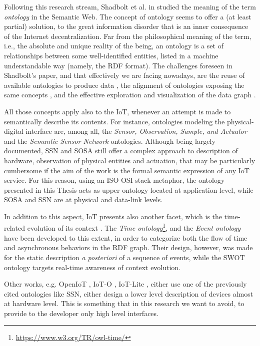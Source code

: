 Following this research stream, Shadbolt et al. in \cite{shadbolt2006semantic} studied the meaning of the term \textit{ontology} in the Semantic Web. The concept of ontology seems to offer a (at least partial) solution, to the great information disorder that is an inner consequence of the Internet decentralization. Far from the philosophical meaning of the term, i.e., the absolute and unique reality of the being, an ontology is a set of relationships between some well-identified entities, listed in a machine understandable way (namely, the RDF format). The challenges foreseen in Shadbolt's paper, and that effectively we are facing nowadays, are the reuse of available ontologies to produce data \cite{uschold1998ontology, bontas2005case, pan2006semantic}, the alignment of ontologies exposing the same concepts \cite{karim2007providing}, and the effective exploration and visualization of the data graph \cite{antoniazzi2018rdf, bikakis2016exploration}.

All those concepts apply also to the IoT, whenever an attempt is made to semantically describe its contents. For instance, ontologies modeling the physical-digital interface are, among all, the \textit{Sensor, Observation, Sample, and Actuator} and the \textit{Semantic Sensor Network}  ontologies. Although being largely documented, SSN and SOSA still offer a complex approach to description of hardware, observation of physical entities and actuation, that may be particularly cumbersome if the aim of the work is the formal semantic expression of any IoT service. For this reason, using an ISO-OSI stack metaphor, the ontology presented in this Thesis acts as upper ontology located at application level, while SOSA and SSN are at physical and data-link levels.

In addition to this aspect, IoT presents also another facet, which is the time-related evolution of its context \cite{rinne2013event}. The \textit{Time ontology}\footnote{\url{https://www.w3.org/TR/owl-time/}}, and the \textit{Event ontology}  have been developed to this extent, in order to categorize both the flow of time and asynchronous behaviors in the RDF graph. Their design, however, was made for the static description \textit{a posteriori} of a sequence of events, while the SWOT ontology targets real-time awareness of context evolution.

Other works, e.g. OpenIoT \cite{soldatos2015openiot}, IoT-O  \cite{seydoux2016iot}, IoT-Lite \cite{bermudez2017iot}, either use one of the previously cited ontologies like SSN, either design a lower level description of devices almost at hardware level. This is something that in this research we want to avoid, to provide to the developer only high level interfaces.

